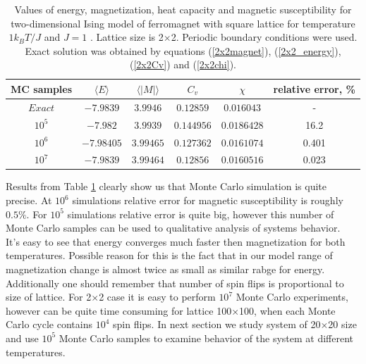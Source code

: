 \documentclass[10pt]{article}
\begin{document}
\begin{table}[h!]
  \caption{Values of energy, magnetization, heat capacity and magnetic susceptibility for two-dimensional Ising model of ferromagnet with square lattice for temperature $1k_BT/J$ and $J=1$ . Lattice size is 2$\times$2. Periodic boundary conditions were used. Exact solution was obtained by equations (\ref{2x2magnet}), (\ref{2x2_energy}), (\ref{2x2Cv}) and (\ref{2x2chi}). }
  \label{tab:2x2_compare}
  \begin{center}
    \begin{tabular}{c|c|c|c|c|c}
    \hline
		MC samples & $\langle E\rangle$ & $\langle \left\vert M\right\vert \rangle$ & $C_{v}$ & $\chi$ & relative error, \% \\
        \hline
	$	Exact $ & $-7.9839$ & $ 3.9946 $ & $ 0.12859 $ & $ 0.016043 $ & - \\
	$	10^5 $  & $-7.982$ & $ 3.9939 $ & $ 0.144956 $ & $ 0.0186428 $ & 16.2 \\
	$	10^6 $  & $-7.98405$ & $ 3.99465 $ & $ 0.127362 $ & $ 0.0161074 $ & 0.401 \\
	$	10^7 $  & $-7.9839$ & $ 3.99464 $ & $ 0.12856 $ & $ 0.0160516 $ & 0.023 \\

	\end{tabular}
  \end{center}
\end{table}

Results from Table \ref{tab:2x2_compare} clearly show us that Monte Carlo simulation is quite precise. At $10^6$ simulations relative error for magnetic susceptibility is roughly $0.5 \%$. For $10^5$ simulations relative error is quite big, however this number of Monte Carlo samples can be used to qualitative analysis of systems behavior.\\
It's easy to see that energy converges much faster then magnetization for both temperatures. Possible reason for this is the fact that in our model range of magnetization change is almost twice as small as similar rabge for energy. 
Additionally one should remember that number of spin flips is proportional to size of lattice. For 2$\times$2 case it is easy to perform $10^7$ Monte Carlo experiments, however can be quite time consuming for lattice 100$\times$100, when each Monte Carlo cycle contains $10^4$ spin flips. 
In next section we study system of 20$\times$20 size and use $10^5$ Monte Carlo samples to examine behavior of the system at different temperatures. 
\end{document}
